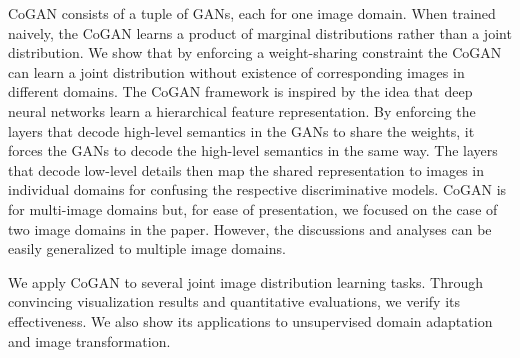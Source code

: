 CoGAN consists of a tuple of GANs, each for one image domain. When trained naively, the CoGAN learns a product of marginal distributions rather than a joint distribution. We show that by enforcing a weight-sharing constraint the CoGAN can learn a joint distribution without existence of corresponding images in different domains. The CoGAN framework is inspired by the idea that deep neural networks learn a hierarchical feature representation. By enforcing the layers that decode high-level semantics in the GANs to share the weights, it forces the GANs to decode the high-level semantics in the same way. The layers that decode low-level details then map the shared representation to images in individual domains for confusing the respective discriminative models. CoGAN is for multi-image domains but, for ease of presentation, we focused on the case of two image domains in the paper. However, the discussions and analyses can be easily generalized to multiple image domains.

We apply CoGAN to several joint image distribution learning tasks. Through convincing visualization results and quantitative evaluations, we verify its effectiveness. We also show its applications to unsupervised domain adaptation and image transformation.